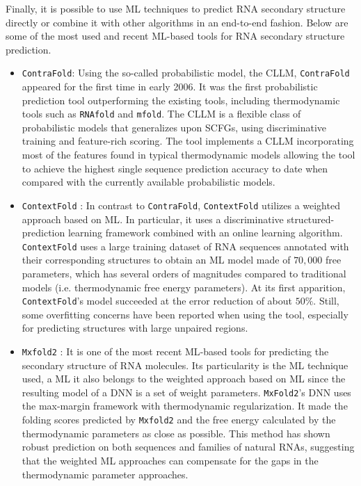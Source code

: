 Finally, it is possible to use \ac{ML} techniques to predict \ac{RNA} secondary structure directly or combine it with other algorithms in an end-to-end fashion. Below are some of the most used and recent \ac{ML}-based tools for \ac{RNA} secondary structure prediction.
\begin{itemize}
	\item \texttt{ContraFold}\cite{do2006contrafold}: Using the so-called probabilistic model, the \ac{CLLM}, \texttt{ContraFold} appeared for the first time in early 2006. It was the first probabilistic prediction tool outperforming the existing tools, including thermodynamic tools such as \texttt{RNAfold} and \texttt{mfold}. The \ac{CLLM} is a flexible class of probabilistic models that generalizes upon \acp{SCFG}, using discriminative training and feature-rich scoring. The tool implements a \ac{CLLM} incorporating most of the features found in typical thermodynamic models allowing the tool to achieve the highest single sequence prediction accuracy to date when compared with the currently available probabilistic models.
	\item \texttt{ContextFold} \cite{zakov2011rich}: In contrast to \texttt{ContraFold}, \texttt{ContextFold} utilizes a weighted approach based on \ac{ML}. In particular, it uses a discriminative structured-prediction learning framework combined with an online learning algorithm. \texttt{ContextFold} uses a large training dataset of \ac{RNA} sequences annotated with their corresponding structures to obtain an \ac{ML} model made of $70,000$ free parameters, which has several orders of magnitudes compared to traditional models (i.e. thermodynamic free energy parameters). At its first apparition, \texttt{ContextFold}'s model succeeded at the error reduction of about $50\%$. Still, some overfitting concerns have been reported when using the tool, especially for predicting structures with large unpaired regions.  
	\item \texttt{Mxfold2}  \cite{sato2021rna}: It is one of the most recent \ac{ML}-based tools for predicting the secondary structure of \ac{RNA} molecules. Its particularity is the \ac{ML} technique used, a \ac{ML} it also belongs to the weighted approach based on \ac{ML} since the resulting model of a \ac{DNN} is a set of weight parameters. \texttt{MxFold2}'s \ac{DNN} uses the max-margin framework with thermodynamic regularization. It made the folding scores predicted by \texttt{Mxfold2} and the free energy calculated by the thermodynamic parameters as close as possible. This method has shown robust prediction on both sequences and families of natural \acp{RNA}, suggesting that the weighted \ac{ML} approaches can compensate for the gaps in the thermodynamic parameter approaches. 
\end{itemize}

